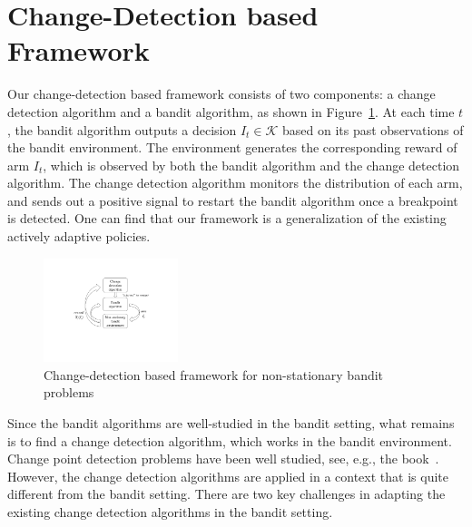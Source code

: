 \documentclass[letterpaper]{article} %
\begin{document}
\section{Change-Detection based Framework}\label{sec:framework}
Our change-detection based framework consists of two components: a change detection algorithm and a bandit algorithm, as shown in Figure~\ref{fig:framework}. At each time $t$, the bandit algorithm outputs a decision $I_t\in\mathcal{K}$ based on its past observations of the bandit environment. The environment generates the corresponding reward of arm $I_t$, which is observed by both the bandit algorithm and the change detection algorithm. The change detection algorithm monitors the distribution of each arm, and sends out a positive signal to restart the bandit algorithm once a breakpoint is detected. One can find that our framework is a generalization of the existing actively adaptive policies.
\begin{figure}
  \centering
    \includegraphics[width=0.35\textwidth]{Slide1} %
     \caption{Change-detection based framework for non-stationary bandit problems}
     \label{fig:framework}
\end{figure}


Since the bandit algorithms are well-studied in the bandit setting, what remains is to find a change detection algorithm, which works in the bandit environment. Change point detection problems have been well studied, see, e.g., the book~\cite{basseville1993detection}. However, the change detection algorithms are applied in a context that is quite different from the bandit setting. There are two key challenges in adapting the existing change detection algorithms in the bandit setting.
\end{document}

